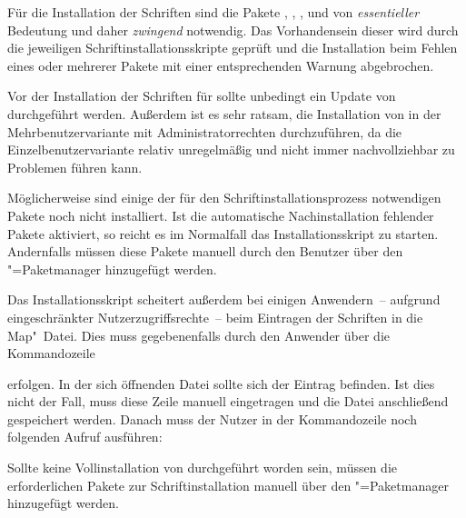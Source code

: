 Für die Installation der Schriften sind die Pakete , 
, ,  und 
 von \emph{essentieller} Bedeutung und daher \emph{zwingend} 
notwendig. Das Vorhandensein dieser wird durch die jeweiligen 
Schriftinstallationsskripte geprüft und die Installation beim Fehlen eines oder 
mehrerer Pakete mit einer entsprechenden Warnung abgebrochen.

Vor der Installation der Schriften für \TUDScript sollte unbedingt ein Update 
von  durchgeführt werden. Außerdem ist es sehr 
ratsam, die Installation von  in der 
Mehrbenutzervariante mit Administratorrechten durchzuführen, da die 
Einzelbenutzervariante relativ unregelmäßig und nicht immer nachvollziehbar zu 
Problemen führen kann. 

Möglicherweise sind einige der für den Schriftinstallationsprozess notwendigen 
Pakete noch nicht installiert. Ist die automatische Nachinstallation fehlender 
Pakete aktiviert, so reicht es im Normalfall das Installationsskript zu 
starten. Andernfalls müssen diese Pakete manuell durch den Benutzer über den 
"=Paketmanager hinzugefügt werden.

Das Installationsskript scheitert außerdem bei einigen Anwendern~-- aufgrund 
eingeschränkter Nutzerzugriffsrechte~-- beim Eintragen der Schriften in die 
Map"~Datei. Dies muss gegebenenfalls durch den Anwender über die Kommandozeile 
%
\begin{quoting}
\end{quoting}
%
erfolgen. In der sich öffnenden Datei sollte sich der Eintrag 
 befinden. Ist dies nicht der Fall, muss diese Zeile 
manuell eingetragen und die Datei anschließend gespeichert werden. Danach muss 
der Nutzer in der Kommandozeile noch folgenden Aufruf ausführen:
%
\begin{quoting}
\end{quoting}


Sollte keine Vollinstallation von  durchgeführt 
worden sein, müssen die erforderlichen Pakete zur Schriftinstallation manuell 
über den "=Paketmanager hinzugefügt werden.

